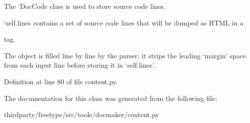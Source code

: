 The `\+Doc\+Code\textquotesingle{} class is used to store source code lines.

`self.lines\textquotesingle{} contains a set of source code lines that will be dumped as H\+T\+ML in a 
\begin{DoxyPre} tag.\end{DoxyPre}



\begin{DoxyPre}  The object is filled line by line by the parser; it strips the leading
  `margin' space from each input line before storing it in `self.lines'.
\end{DoxyPre}


Definition at line 80 of file content.\+py.



The documentation for this class was generated from the following file\+:\begin{DoxyCompactItemize}
\item 
thirdparty/freetype/src/tools/docmaker/content.\+py\end{DoxyCompactItemize}
